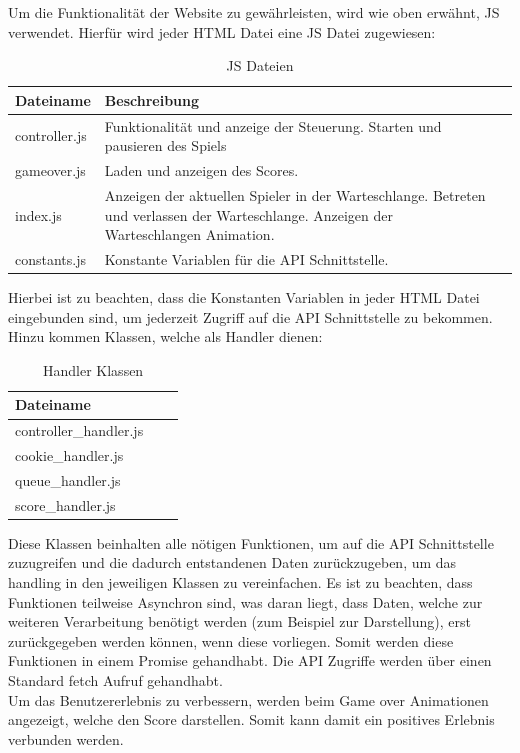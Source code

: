 \documentclass[a4paper,12pt]{scrartcl}
\begin{document}
Um die Funktionalität der Website zu gewährleisten, wird wie oben erwähnt, JS verwendet. Hierfür wird jeder HTML Datei eine JS Datei zugewiesen:


\begin{table}
\centering
\begin{tabular}[!htb]{p{4cm}|p{4cm}|p{8cm}}
Dateiname & Beschreibung \\
\hline
controller.js & Funktionalität und anzeige der Steuerung. Starten und pausieren des Spiels \\
gameover.js & Laden und anzeigen des Scores. \\
index.js & Anzeigen der aktuellen Spieler in der Warteschlange. Betreten und verlassen der Warteschlange. Anzeigen der Warteschlangen Animation. \\
constants.js & Konstante Variablen für die API Schnittstelle. \\
\end{tabular}
\caption{JS Dateien}
\end{table}

Hierbei ist zu beachten, dass die Konstanten Variablen in jeder HTML Datei eingebunden sind, um jederzeit Zugriff auf die API Schnittstelle zu bekommen. Hinzu kommen Klassen, welche als Handler dienen:

\newpage
\begin{table}
\centering
\begin{tabular}[!htb]{p{4cm}|p{4cm}|p{8cm}}
Dateiname \\
\hline
controller\_handler.js \\
cookie\_handler.js \\
queue\_handler.js \\
score\_handler.js \\
\end{tabular}
\caption{Handler Klassen}
\end{table}

Diese Klassen beinhalten alle nötigen Funktionen, um auf die API Schnittstelle zuzugreifen und die dadurch entstandenen Daten zurückzugeben, um das handling in den jeweiligen Klassen zu vereinfachen. Es ist zu beachten, dass Funktionen teilweise Asynchron sind, was daran liegt, dass Daten, welche zur weiteren Verarbeitung benötigt werden (zum Beispiel zur Darstellung), erst zurückgegeben werden können, wenn diese vorliegen. Somit werden diese Funktionen in einem Promise gehandhabt. Die API Zugriffe werden über einen Standard fetch Aufruf gehandhabt. \\
Um das Benutzererlebnis zu verbessern, werden beim Game over Animationen angezeigt, welche den Score darstellen. Somit kann damit ein positives Erlebnis verbunden werden.
\end{document}
